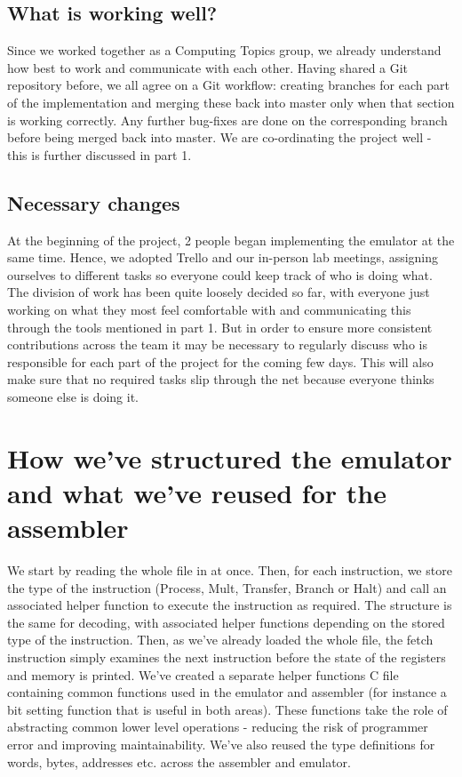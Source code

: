 \documentclass[12pt,twoside]{article}
\begin{document}
\subsection{What is working well?}
Since we worked together as a Computing Topics group, we already understand how best to work and communicate with each other. Having shared a Git repository before, we all agree on a Git workflow: creating branches for each part of the implementation and merging these back into master only when that section is working correctly. Any further bug-fixes are done on the corresponding branch before being merged back into master. We are co-ordinating the project well - this is further discussed in part 1.
\subsection{Necessary changes}
At the beginning of the project, 2 people began implementing the emulator at the same time. Hence, we adopted Trello and our in-person lab meetings, assigning ourselves to different tasks so everyone could keep track of who is doing what.\\

The division of work has been quite loosely decided so far, with everyone just working on what they most feel comfortable with and communicating this through the tools mentioned in part 1. But in order to ensure more consistent contributions across the team it may be necessary to regularly discuss who is responsible for each part of the project for the coming few days. This will also make sure that no required tasks slip through the net because everyone thinks someone else is doing it.
\section{How we've structured the emulator and what we've reused for the assembler}
We start by reading the whole file in at once. Then, for each instruction, we store the type of the instruction (Process, Mult, Transfer, Branch or Halt) and call an associated helper function to execute the instruction as required. The structure is the same for decoding, with associated helper functions depending on the stored type of the instruction. Then, as we've already loaded the whole file, the fetch instruction simply examines the next instruction before the state of the registers and memory is printed.
We've created a separate helper functions C file containing common functions used in the emulator and assembler (for instance a bit setting function that is useful in both areas). These functions take the role of abstracting common lower level operations - reducing the risk of programmer error and improving maintainability. We've also reused the type definitions for words, bytes, addresses etc. across the assembler and emulator.
\end{document}
